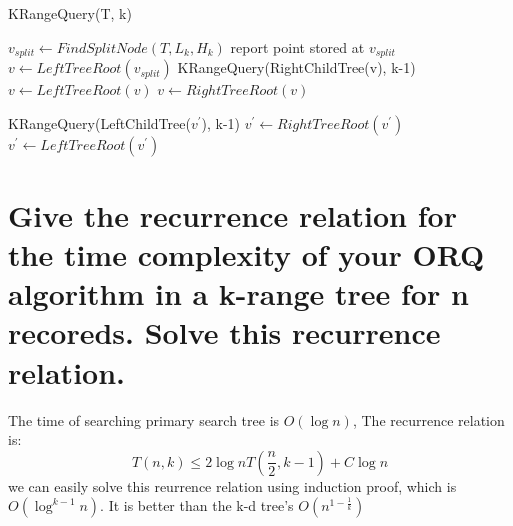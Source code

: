 \documentclass{report}
\begin{document}
\begin{algorithm}
\caption{KRangeQuery(T, k)}
\begin{algorithmic}

   \STATE $v_{split} \leftarrow FindSplitNode(T, L_{k}, H_{k})$
   \STATE report point stored at $v_{split}$
   \ELSE
   \STATE $v \leftarrow LeftTreeRoot(v_{split})$
   \ENDIF
   		\STATE KRangeQuery(RightChildTree(v), k-1)
   		\STATE $v \leftarrow LeftTreeRoot(v)$
		\ELSE
		\STATE $v \leftarrow RightTreeRoot(v)$
   		\ENDIF
   \ENDWHILE
   
   		\STATE KRangeQuery(LeftChildTree($v^{'}$), k-1)
   		\STATE $v^{'} \leftarrow RightTreeRoot(v^{'})$
		\ELSE
		\STATE $v^{'} \leftarrow LeftTreeRoot(v^{'})$
   		\ENDIF
   \ENDWHILE
\end{algorithmic}
\end{algorithm}

\section{Give the recurrence relation for the time complexity of your ORQ algorithm in a k-range tree for n recoreds. Solve this recurrence relation.}
The time of searching primary search tree is $O(\log n)$, The recurrence relation is:
$$
T(n, k) \leq 2\log nT(\frac {n}{2}, k-1) + C\log n
$$
we can easily solve this reurrence relation using induction proof, which is $O(\log^{k-1} n)$. It is better than the k-d tree's $O(n^{1- \frac {1}{k}})$
\end{document}

